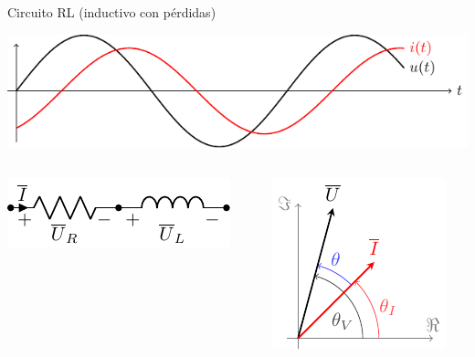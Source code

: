 \documentclass[xcolor={usenames,svgnames,dvipsnames}]{beamer}
\begin{document}
\begin{frame}[label={sec:org61b1c0d}]{Circuito RL (inductivo con pérdidas)}
\begin{center}
\includegraphics[height=0.25\textheight]{figs/inductivo.pdf}
\end{center}
\begin{columns}
\begin{column}{0.45\columnwidth}
\begin{center}
\includegraphics[width=.9\linewidth]{figs/RL.pdf}
\end{center}
\end{column}


\begin{column}{0.55\columnwidth}
\begin{center}
\includegraphics[height=0.5\textheight]{figs/fasorInductanciaReal_VI.pdf}
\end{center}
\end{column}
\end{columns}
\end{frame}
\end{document}
